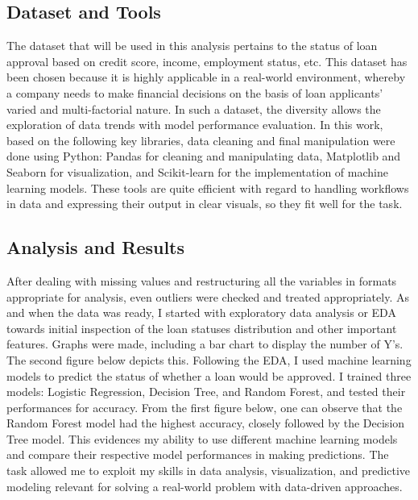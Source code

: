 \documentclass[a4paper,12pt]{article}
\begin{document}
\subsection{Dataset and Tools}
The dataset that will be used in this analysis pertains to the status of loan approval based on credit score, income, employment status, etc. This dataset has been chosen because it is highly applicable in a real-world environment, whereby a company needs to make financial decisions on the basis of loan applicants' varied and multi-factorial nature. In such a dataset, the diversity allows the exploration of data trends with model performance evaluation.
In this work, based on the following key libraries, data cleaning and final manipulation were done using Python: Pandas for cleaning and manipulating data, Matplotlib and Seaborn for visualization, and Scikit-learn for the implementation of machine learning models. These tools are quite efficient with regard to handling workflows in data and expressing their output in clear visuals, so they fit well for the task.


\subsection{Analysis and Results}
After dealing with missing values and restructuring all the variables in formats appropriate for analysis, even outliers were checked and treated appropriately. As and when the data was ready, I started with exploratory data analysis or EDA towards initial inspection of the loan statuses distribution and other important features. Graphs were made, including a bar chart to display the number of Y's. The second figure below depicts this.
Following the EDA, I used machine learning models to predict the status of whether a loan would be approved. I trained three models: Logistic Regression, Decision Tree, and Random Forest, and tested their performances for accuracy. From the first figure below, one can observe that the Random Forest model had the highest accuracy, closely followed by the Decision Tree model. This evidences my ability to use different machine learning models and compare their respective model performances in making predictions. The task allowed me to exploit my skills in data analysis, visualization, and predictive modeling relevant for solving a real-world problem with data-driven approaches.
\end{document}
